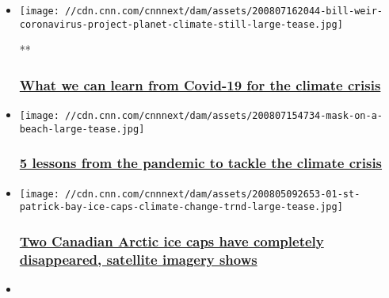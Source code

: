 \begin{itemize}
\item
  \href{/videos/weather/2020/08/07/bill-weir-climate-covid-19-project-planet-orig.cnn}{}

  \texttt{[image: //cdn.cnn.com/cnnnext/dam/assets/200807162044-bill-weir-coronavirus-project-planet-climate-still-large-tease.jpg]}

  **

  \hypertarget{what-we-can-learn-from-covid-19-for-the-climate-crisis-1}{%
  \subsubsection{\texorpdfstring{\href{/videos/weather/2020/08/07/bill-weir-climate-covid-19-project-planet-orig.cnn}{What
  we can learn from Covid-19 for the climate
  crisis}}{What we can learn from Covid-19 for the climate crisis}}\label{what-we-can-learn-from-covid-19-for-the-climate-crisis-1}}
\item
  \href{/2020/08/07/weather/5-lessons-coronavirus-climate-crisis-weir-wxc/index.html}{}

  \texttt{[image: //cdn.cnn.com/cnnnext/dam/assets/200807154734-mask-on-a-beach-large-tease.jpg]}

  \hypertarget{5-lessons-from-the-pandemic-to-tackle-the-climate-crisis--1}{%
  \subsubsection{\texorpdfstring{\href{/2020/08/07/weather/5-lessons-coronavirus-climate-crisis-weir-wxc/index.html}{5
  lessons from the pandemic to tackle the climate crisis
  }}{5 lessons from the pandemic to tackle the climate crisis }}\label{5-lessons-from-the-pandemic-to-tackle-the-climate-crisis--1}}
\item
  \href{/2020/08/05/weather/st-patrick-bay-ice-caps-climate-change-trnd-scn/index.html}{}

  \texttt{[image: //cdn.cnn.com/cnnnext/dam/assets/200805092653-01-st-patrick-bay-ice-caps-climate-change-trnd-large-tease.jpg]}

  \hypertarget{two-canadian-arctic-ice-caps-have-completely-disappeared-satellite-imagery-shows}{%
  \subsubsection{\texorpdfstring{\href{/2020/08/05/weather/st-patrick-bay-ice-caps-climate-change-trnd-scn/index.html}{Two
  Canadian Arctic ice caps have completely disappeared, satellite
  imagery
  shows}}{Two Canadian Arctic ice caps have completely disappeared, satellite imagery shows}}\label{two-canadian-arctic-ice-caps-have-completely-disappeared-satellite-imagery-shows}}
\item
  \href{/videos/weather/2020/04/20/earth-day-50-project-planet-orig.cnn}{}


\end{itemize}
